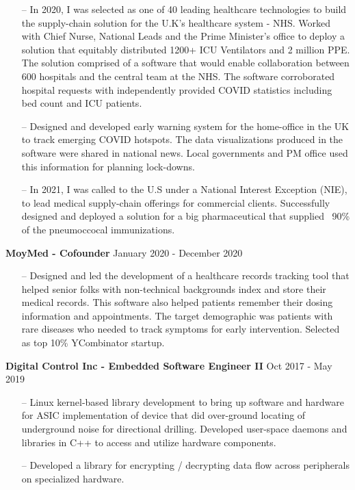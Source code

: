 \documentclass[a4paper,12pt]{article}
\begin{document}
\begin{itemize}[nosep,after=\strut, leftmargin=1em, itemsep=3pt]
\begin{itemize}[nosep,after=\strut, leftmargin=1em, itemsep=3pt]
            \item[--] In 2020, I was selected as one of 40 leading healthcare technologies to build the supply-chain solution for the U.K's healthcare system - NHS. Worked with Chief Nurse, National Leads and the Prime Minister's office to deploy a solution that equitably distributed 1200+ ICU Ventilators and 2 million PPE. The solution comprised of a software that would enable collaboration between 600 hospitals and the central team at the NHS. The software corroborated hospital requests with independently provided COVID statistics including bed count and ICU patients.
            \item[--] Designed and developed early warning system for the home-office in the UK to track emerging COVID hotspots. The data visualizations produced in the software were shared in national news. Local governments and PM office used this information for planning lock-downs.
            \item[--] In 2021, I was called to the U.S under a National Interest Exception (NIE), to lead medical supply-chain offerings for commercial clients. Successfully designed and deployed a solution for a big pharmaceutical that supplied ~90\% of the pneumoccocal immunizations.
        \end{itemize}
    \end{itemize}

\textbf{MoyMed - Cofounder} \hfill January 2020 - December 2020
    \begin{itemize}[nosep,after=\strut, leftmargin=1em, itemsep=3pt]
        \item[--] Designed and led the development of a healthcare records tracking tool that helped senior folks with non-technical backgrounds index and store their medical records. This software also helped patients remember their dosing information and appointments. The target demographic was patients with rare diseases who needed to track symptoms for early intervention. Selected as top 10\% YCombinator startup.
    \end{itemize}

\textbf{Digital Control Inc - Embedded Software Engineer II} \hfill Oct 2017 - May 2019
\begin{itemize}[nosep,after=\strut, leftmargin=1em, itemsep=3pt]
    \item[--] Linux kernel-based library development to bring up software and hardware for ASIC implementation of device that did over-ground locating of underground noise for directional drilling. Developed user-space daemons and libraries in C++ to access and utilize hardware components.
    \item[--] Developed a library for encrypting / decrypting data flow across peripherals on specialized hardware.
\end{itemize}
\end{document}
